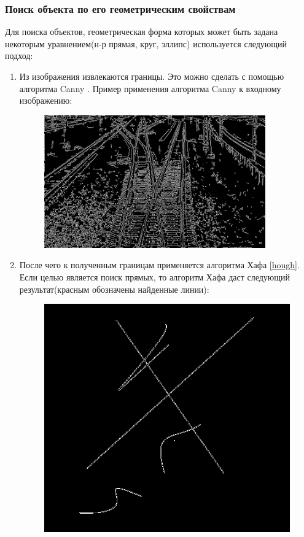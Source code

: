 \subsubsection{Поиск объекта по его геометрическим свойствам}
Для поиска объектов, геометрическая форма которых может быть задана некоторым уравнением(н-р прямая, круг, эллипс) используется следующий подход:
\begin{enumerate}
	\item Из изображения извлекаются границы. Это можно сделать с помощью алгоритма Canny \cite{b:canny}. \newline
	Пример применения алгоритма Canny к входному изображению:
	\begin{figure}[!h]
		\centering
		\includegraphics[width=0.9\textwidth]{pictures/canny_res}
		\caption[Применение алгоритма Canny]{}
		\label{fig:cannyres}
	\end{figure}
	\item После чего к полученным границам применяется алгоритма Хафа \ref{hough}. Если целью является поиск прямых, то алгоритм Хафа даст следующий результат(красным обозначены найденные линии):
		\begin{figure}[!h]
		\centering
		\begin{minipage}{0.45\textwidth}
			\centering
			\includegraphics[width=0.7\linewidth]{pictures/canny_ex}

\end{minipage}
\end{figure}
\end{enumerate}
